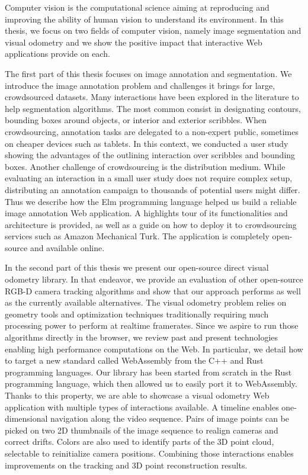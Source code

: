Computer vision is the computational science aiming at reproducing and improving
the ability of human vision to understand its environment.
In this thesis, we focus on two fields of computer vision, namely image segmentation
and visual odometry and
we show the positive impact that interactive Web applications provide on each.

The first part of this thesis focuses on image annotation and segmentation.
We introduce the image annotation problem
and challenges it brings for large, crowdsourced datasets.
Many interactions have been explored in the literature to help segmentation algorithms.
The most common consist in designating contours,
bounding boxes around objects,
or interior and exterior scribbles.
When crowdsourcing, annotation tasks are delegated
to a non-expert public, sometimes on cheaper devices such as tablets.
In this context, we conducted a user study showing
the advantages of the outlining interaction over scribbles and bounding boxes.
Another challenge of crowdsourcing is the distribution medium.
While evaluating an interaction in a small user study does not require complex setup,
distributing an annotation campaign to thousands of potential users might differ.
Thus we describe how the Elm programming language helped us
build a reliable image annotation Web application.
A highlights tour of its functionalities and architecture is provided,
as well as a guide on how to deploy it to crowdsourcing services
such as Amazon Mechanical Turk.
The application is completely open-source and available online.

In the second part of this thesis we present our open-source
direct visual odometry library.
In that endeavor, we provide an evaluation of other open-source
RGB-D camera tracking algorithms and show that our approach
performs as well as the currently available alternatives.
The visual odometry problem relies on geometry tools and optimization techniques
traditionally requiring much processing power to perform at realtime framerates.
Since we aspire to run those algorithms directly in the browser,
we review past and present technologies
enabling high performance computations on the Web.
In particular, we detail how to target a new standard called WebAssembly from
the C++ and Rust programming languages.
Our library has been started from scratch in the Rust programming language,
which then allowed us to easily port it to WebAssembly.
Thanks to this property, we are able to showcase
a visual odometry Web application with multiple types of interactions available.
A timeline enables one-dimensional navigation along the video sequence.
Pairs of image points can be picked on two 2D thumbnails
of the image sequence to realign cameras and correct drifts.
Colors are also used to identify parts of the 3D point cloud,
selectable to reinitialize camera positions.
Combining those interactions enables improvements
on the tracking and 3D point reconstruction results.
